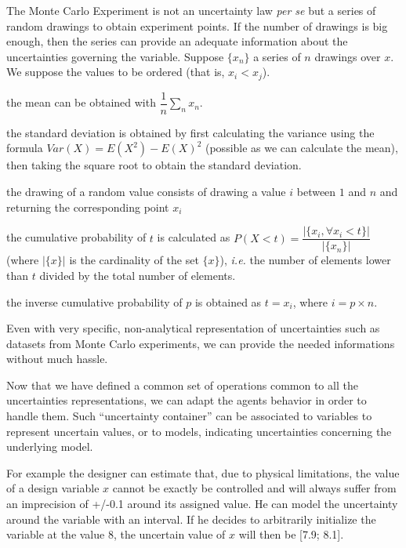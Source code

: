 The Monte Carlo Experiment is not an uncertainty law \emph{per se} but a series of random drawings to obtain experiment points. If the number of drawings is big enough, then the series can provide an adequate information about the uncertainties governing the variable. Suppose $\{x_n\}$ a series of $n$ drawings over $x$. We suppose the values to be ordered (that is, $x_i < x_j$). 

\begin{compactitem}
\item the mean can be obtained with $\dfrac{1}{n}\displaystyle\sum_n{x_n}$.
\item the standard deviation is obtained by first calculating the variance using the formula $Var(X) = E(X^2) - E(X)^2$ (possible as we can calculate the mean), then taking the square root to obtain the standard deviation.
\item the drawing of a random value consists of drawing a value $i$ between $1$ and $n$ and returning the corresponding point $x_i$
\item the cumulative probability of $t$ is calculated as $P(X < t) = \dfrac{|\{x_i, \forall x_i < t\}|}{|\{x_n\}|}$ (where $|\{x\}|$ is the cardinality of the set $\{x\}$), \emph{i.e.} the number of elements lower than $t$ divided by the total number of elements.
\item the inverse cumulative probability of $p$ is obtained as $ t = x_i$, where $i = p \times  n$.
\end{compactitem}

Even with very specific, non-analytical representation of uncertainties such as datasets from Monte Carlo experiments, we can provide the needed informations without much hassle.

Now that we have defined a common set of operations common to all the uncertainties representations, we can adapt the agents behavior in order to handle them. Such \enquote{uncertainty container} can be associated to variables to represent uncertain values, or to models, indicating uncertainties concerning the underlying model.

For example the designer can estimate that, due to physical limitations, the value of a design variable $x$ cannot be exactly be controlled and will always suffer from an imprecision of +/-0.1 around its assigned value. He can model the uncertainty around the variable with an interval. If he decides to arbitrarily initialize the variable at the value 8, the uncertain value of $x$ will then be [7.9; 8.1].

